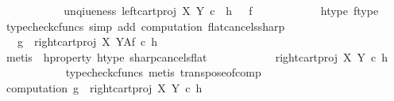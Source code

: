 \begin{isabellebody}
\ \ \ \ \ \ \ \ \isamarkupfalse%
\ \isamarkupfalse%
\ unqiueness{}{\isacharcolon}{\kern0pt}\ {\isachardoublequoteopen}{\isacharparenleft}{\kern0pt}left{\isacharunderscore}{\kern0pt}cart{\isacharunderscore}{\kern0pt}proj\ X\ Y{\isacharparenright}{\kern0pt}\ {\isasymcirc}\isactrlsub c\ \ h\isactrlsup {\isasymflat}\ {\isacharequal}{\kern0pt}\ \ f\isactrlsup {\isasymflat}{\isachardoublequoteclose}\isanewline
\ \ \ \ \ \ \ \ \ \ \isamarkupfalse%
\ h{\isacharunderscore}{\kern0pt}type\ f{\isacharunderscore}{\kern0pt}type\ \isamarkupfalse%
\ {\isacharparenleft}{\kern0pt}typecheck{\isacharunderscore}{\kern0pt}cfuncs{\isacharcomma}{\kern0pt}\ simp\ add{\isacharcolon}{\kern0pt}\ computation{}\ flat{\isacharunderscore}{\kern0pt}cancels{\isacharunderscore}{\kern0pt}sharp{\isacharparenright}{\kern0pt}\isanewline
\ \ \ \ \ \ \ \ \isamarkupfalse%
\ \ \ {\isachardoublequoteopen}g\ {\isacharequal}{\kern0pt}\ {\isacharparenleft}{\kern0pt}{\isacharparenleft}{\kern0pt}right{\isacharunderscore}{\kern0pt}cart{\isacharunderscore}{\kern0pt}proj\ X\ Y{\isacharparenright}{\kern0pt}\isactrlbsup A\isactrlesup \isactrlsub f{\isacharparenright}{\kern0pt}\ {\isasymcirc}\isactrlsub c\ {\isacharparenleft}{\kern0pt}h\isactrlsup {\isasymflat}{\isacharparenright}{\kern0pt}\isactrlsup {\isasymsharp}{\isachardoublequoteclose}\isanewline
\ \ \ \ \ \ \ \ \ \ \isamarkupfalse%
\ {\isacharparenleft}{\kern0pt}metis\ \ h{\isacharunderscore}{\kern0pt}property{}\ h{\isacharunderscore}{\kern0pt}type\ sharp{\isacharunderscore}{\kern0pt}cancels{\isacharunderscore}{\kern0pt}flat{\isacharparenright}{\kern0pt}\isanewline
\ \ \ \ \ \ \ \ \isamarkupfalse%
\ {\isachardoublequoteopen}{\isachardot}{\kern0pt}{\isachardot}{\kern0pt}{\isachardot}{\kern0pt}\ {\isacharequal}{\kern0pt}\ {\isacharparenleft}{\kern0pt}{\isacharparenleft}{\kern0pt}right{\isacharunderscore}{\kern0pt}cart{\isacharunderscore}{\kern0pt}proj\ X\ Y{\isacharparenright}{\kern0pt}\ {\isasymcirc}\isactrlsub c\ h\isactrlsup {\isasymflat}{\isacharparenright}{\kern0pt}\isactrlsup {\isasymsharp}{\isachardoublequoteclose}\isanewline
\ \ \ \ \ \ \ \ \ \ \isamarkupfalse%
\ {\isacharparenleft}{\kern0pt}typecheck{\isacharunderscore}{\kern0pt}cfuncs{\isacharcomma}{\kern0pt}\ metis\ transpose{\isacharunderscore}{\kern0pt}of{\isacharunderscore}{\kern0pt}comp{\isacharparenright}{\kern0pt}\isanewline
\ \ \ \ \ \ \ \ \isamarkupfalse%
\ computation{}{\isacharcolon}{\kern0pt}\ {\isachardoublequoteopen}g\ {\isacharequal}{\kern0pt}\ {\isacharparenleft}{\kern0pt}{\isacharparenleft}{\kern0pt}right{\isacharunderscore}{\kern0pt}cart{\isacharunderscore}{\kern0pt}proj\ X\ Y{\isacharparenright}{\kern0pt}\ {\isasymcirc}\isactrlsub c\ h\isactrlsup {\isasymflat}{\isacharparenright}{\kern0pt}\isactrlsup {\isasymsharp}{\isachardoublequoteclose}\isanewline

\end{isabellebody}

